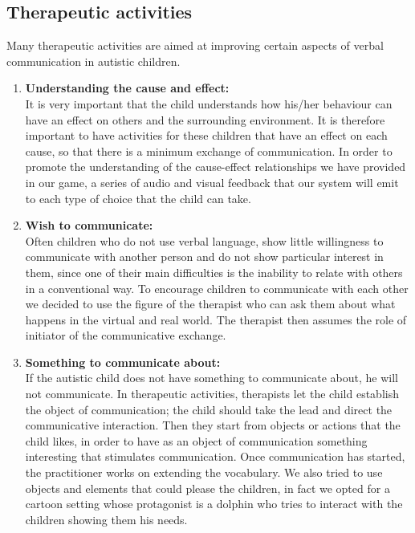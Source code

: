 \documentclass [12pt]{article}
\begin{document}
\subsection{Therapeutic activities}
Many therapeutic activities are aimed at improving certain aspects of verbal communication in autistic children.
\begin{enumerate}
\item \textbf{Understanding the cause and effect:}\\
It is very important that the child understands how his/her behaviour can have an effect on others and the surrounding environment. It is therefore important to have activities for these children that have an effect on each cause, so that there is a minimum exchange of communication. In order to promote the understanding of the cause-effect relationships we have provided in our game, a series of audio and visual feedback that our system will emit to each type of choice that the child can take.
\item \textbf{Wish to communicate:}\\
Often children who do not use verbal language, show little willingness to communicate with another person and do not show particular interest in them, since one of their main difficulties is the inability to relate with others in a conventional way. To encourage children to communicate with each other we decided to use the figure of the therapist who can ask them about what happens in the virtual and real world. The therapist then assumes the role of initiator of the communicative exchange.
\item \textbf{Something to communicate about:}\\
If the autistic child does not have something to communicate about, he will not communicate. In therapeutic activities, therapists let the child establish the object of communication; the child should take the lead and direct the communicative interaction. Then they start from objects or actions that the child likes, in order to have as an object of communication something interesting that stimulates communication. Once communication has started, the practitioner works on extending the vocabulary. We also tried to use objects and elements that could please the children, in fact we opted for a cartoon setting whose protagonist is a dolphin who tries to interact with the children showing them his needs. 
\end{enumerate}
\end{document}
